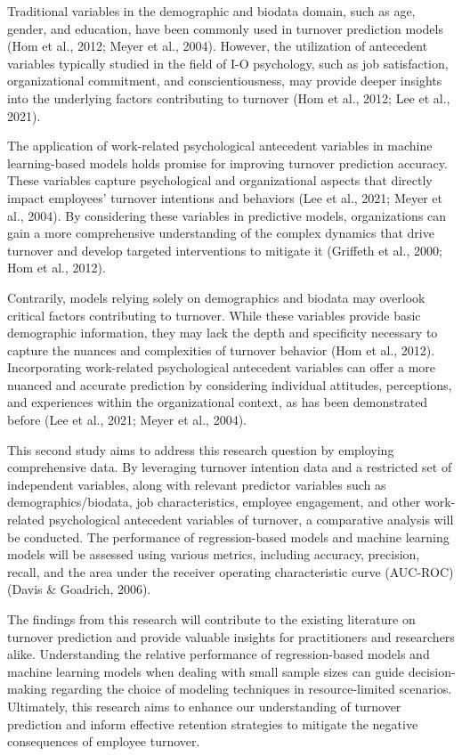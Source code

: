 \documentclass[
  man]{apa7}
\begin{document}
Traditional variables in the demographic and biodata domain, such as age, gender, and education, have been commonly used in turnover prediction models (Hom et al., 2012; Meyer et al., 2004).
However, the utilization of antecedent variables typically studied in the field of I-O psychology, such as job satisfaction, organizational commitment, and conscientiousness, may provide deeper insights into the underlying factors contributing to turnover (Hom et al., 2012; Lee et al., 2021).

The application of work-related psychological antecedent variables in machine learning-based models holds promise for improving turnover prediction accuracy.
These variables capture psychological and organizational aspects that directly impact employees' turnover intentions and behaviors (Lee et al., 2021; Meyer et al., 2004).
By considering these variables in predictive models, organizations can gain a more comprehensive understanding of the complex dynamics that drive turnover and develop targeted interventions to mitigate it (Griffeth et al., 2000; Hom et al., 2012).

Contrarily, models relying solely on demographics and biodata may overlook critical factors contributing to turnover.
While these variables provide basic demographic information, they may lack the depth and specificity necessary to capture the nuances and complexities of turnover behavior (Hom et al., 2012).
Incorporating work-related psychological antecedent variables can offer a more nuanced and accurate prediction by considering individual attitudes, perceptions, and experiences within the organizational context, as has been demonstrated before (Lee et al., 2021; Meyer et al., 2004).

This second study aims to address this research question by employing comprehensive data.
By leveraging turnover intention data and a restricted set of independent variables, along with relevant predictor variables such as demographics/biodata, job characteristics, employee engagement, and other work-related psychological antecedent variables of turnover, a comparative analysis will be conducted.
The performance of regression-based models and machine learning models will be assessed using various metrics, including accuracy, precision, recall, and the area under the receiver operating characteristic curve (AUC-ROC) (Davis \& Goadrich, 2006).

The findings from this research will contribute to the existing literature on turnover prediction and provide valuable insights for practitioners and researchers alike.
Understanding the relative performance of regression-based models and machine learning models when dealing with small sample sizes can guide decision-making regarding the choice of modeling techniques in resource-limited scenarios.
Ultimately, this research aims to enhance our understanding of turnover prediction and inform effective retention strategies to mitigate the negative consequences of employee turnover.
\end{document}
